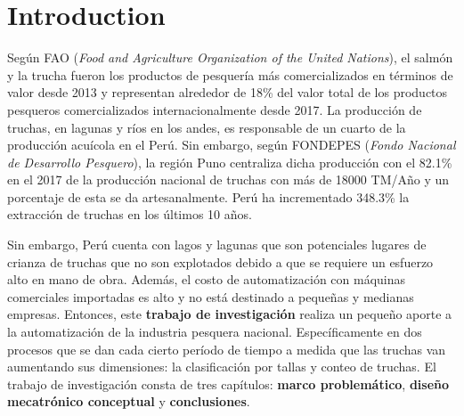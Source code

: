 \chapter*{\centering \large Introduction} 

Según FAO (\textit{Food and Agriculture Organization of the United Nations}), el salmón y la trucha fueron los productos de pesquería más comercializados en términos de valor desde 2013 y representan alrededor de 18\% del valor total de los productos pesqueros comercializados internacionalmente desde 2017. \cite{FAO2017} La producción de truchas, en lagunas y ríos en los andes, es responsable de un cuarto de la producción acuícola en el Perú.\cite{SeafoodTradeIntelligencePortal2018} Sin embargo, según FONDEPES (\textit{Fondo Nacional de Desarrollo Pesquero}), la región Puno centraliza dicha producción con el 82.1\% en el 2017 de la producción nacional de truchas con más de 18000 TM/Año y un porcentaje de esta se da artesanalmente.\cite{FONDEPES2014} Perú ha incrementado 348.3\% la extracción de truchas en los últimos 10 años.\cite{MinisteriodelaProducciondelPeru2018}

Sin embargo, Perú cuenta con lagos y lagunas que son potenciales lugares de crianza de truchas que no son explotados debido a que se requiere un esfuerzo alto en mano de obra. Además, el costo de automatización con máquinas comerciales importadas es alto y no está destinado a pequeñas y medianas empresas. Entonces, este \textbf{trabajo de investigación} realiza un pequeño aporte a la automatización de la industria pesquera nacional. Específicamente en dos procesos que se dan cada cierto período de tiempo a medida que las truchas van aumentando sus dimensiones: la clasificación por tallas y conteo de truchas. El trabajo de investigación consta de tres capítulos: \textbf{marco problemático}, \textbf{diseño mecatrónico conceptual} y \textbf{conclusiones}.

